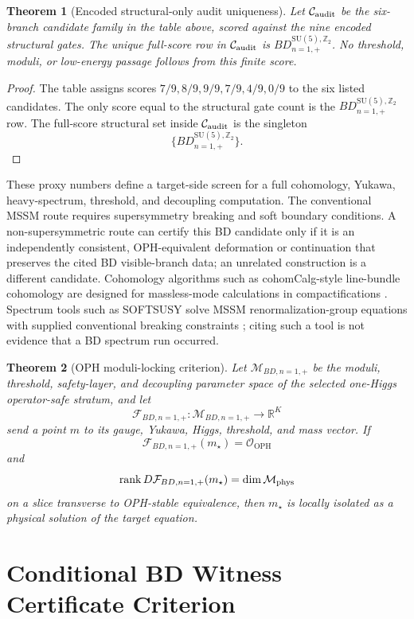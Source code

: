 \documentclass[11pt]{article}
\newtheorem{theorem}{Theorem}[section]
\theoremstyle{remark}
\theoremstyle{plain}
\newcommand{\OPH}{\mathrm{OPH}}
\newcommand{\SU}{\mathrm{SU}}
\newcommand{\Z}{\mathbb Z}
\newcommand{\calF}{\mathcal F}
\newcommand{\calO}{\mathcal O}
\begin{document}
\begin{theorem}[Encoded structural-only audit uniqueness]
Let \(\mathcal C_{\rm audit}\) be the six-branch candidate family in the table above, scored
against the nine encoded structural gates. The unique full-score row in
\(\mathcal C_{\rm audit}\) is \(BD_{n=1,+}^{\SU(5),\Z_2}\). No threshold, moduli, or
low-energy passage follows from this finite score.
\end{theorem}

\begin{proof}
The table assigns scores \(7/9,8/9,9/9,7/9,4/9,0/9\) to the six listed candidates. The only score
equal to the structural gate count is the \(BD_{n=1,+}^{\SU(5),\Z_2}\) row. The full-score
structural set inside \(\mathcal C_{\rm audit}\) is the singleton
\[
\{BD_{n=1,+}^{\SU(5),\Z_2}\}.
\]
\end{proof}

These proxy numbers define a target-side screen for a full cohomology, Yukawa, heavy-spectrum,
threshold, and decoupling computation. The conventional MSSM route requires supersymmetry
breaking and soft boundary conditions. A non-supersymmetric route can certify this BD candidate
only if it is an independently consistent, OPH-equivalent deformation or continuation that
preserves the cited BD visible-branch data; an unrelated construction is a different candidate.
Cohomology algorithms such as
cohomCalg-style line-bundle
cohomology are designed for massless-mode calculations in compactifications
\cite{BlumenhagenJurkeRahnRoschy2010}. Spectrum tools such as SOFTSUSY solve MSSM
renormalization-group equations with supplied conventional breaking constraints
\cite{Allanach2001}; citing such a tool is not evidence that a BD spectrum run occurred.

\begin{theorem}[OPH moduli-locking criterion]
Let \(\mathcal M_{BD,n=1,+}\) be the moduli, threshold, safety-layer, and decoupling
parameter space of the selected one-Higgs operator-safe stratum, and let
\[
\calF_{BD,n=1,+}:\mathcal M_{BD,n=1,+}\to\mathbb R^K
\]
send a point \(m\) to its gauge, Yukawa, Higgs, threshold, and mass vector. If
\[
\calF_{BD,n=1,+}(m_\star)=\calO_{\OPH}
\]
and
\[
\operatorname{rank}D\calF_{BD,n=1,+}(m_\star)=\dim\mathcal M_{\rm phys}
\]
on a slice transverse to OPH-stable equivalence, then \(m_\star\) is locally isolated as a
physical solution of the target equation.
\end{theorem}

\section{Conditional BD Witness Certificate Criterion}
\end{document}
